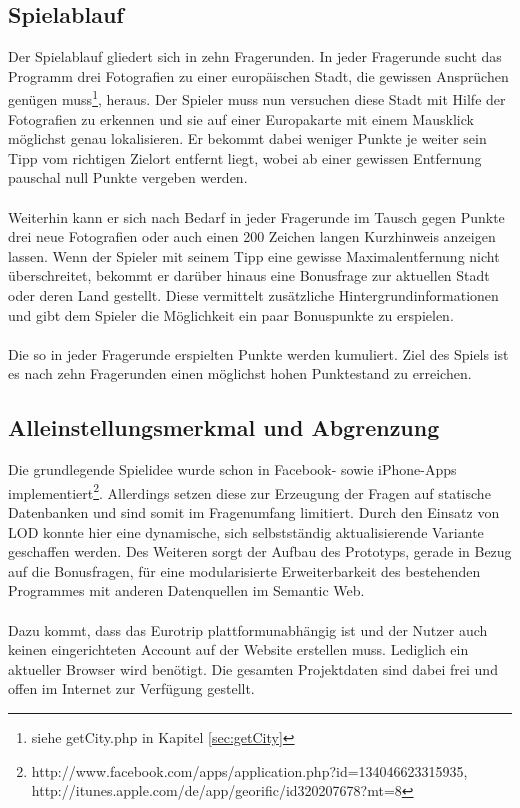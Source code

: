 \documentclass[a4paper, 11pt]{article}
\begin{document}
\subsection{Spielablauf}
Der Spielablauf gliedert sich in zehn Fragerunden. In jeder Fragerunde sucht das Programm drei Fotografien zu einer europäischen Stadt, die gewissen Ansprüchen genügen muss\footnote{siehe getCity.php in Kapitel \ref{sec:getCity}}, heraus. Der Spieler muss nun versuchen diese Stadt mit Hilfe der Fotografien zu erkennen und sie auf einer Europakarte mit einem Mausklick möglichst genau lokalisieren. Er bekommt dabei weniger Punkte je weiter sein Tipp vom richtigen Zielort entfernt liegt, wobei ab einer gewissen Entfernung pauschal null Punkte vergeben werden.\\\\ Weiterhin kann er sich nach Bedarf in jeder Fragerunde im Tausch gegen Punkte drei neue Fotografien oder auch einen 200 Zeichen langen Kurzhinweis anzeigen lassen. Wenn der Spieler mit seinem Tipp eine gewisse Maximalentfernung nicht überschreitet, bekommt er darüber hinaus eine Bonusfrage zur aktuellen Stadt oder deren Land gestellt. Diese vermittelt zusätzliche Hintergrundinformationen und gibt dem Spieler die Möglichkeit ein paar Bonuspunkte zu erspielen.\\\\ 
Die so in jeder Fragerunde erspielten Punkte werden kumuliert. Ziel des Spiels ist es nach zehn Fragerunden einen möglichst hohen Punktestand zu erreichen.
\subsection{Alleinstellungsmerkmal und Abgrenzung}
Die grundlegende Spielidee wurde schon in Facebook- sowie iPhone-Apps implementiert\footnote{http://www.facebook.com/apps/application.php?id=134046623315935, \\http://itunes.apple.com/de/app/georific/id320207678?mt=8}. Allerdings setzen diese zur Erzeugung der Fragen auf statische Datenbanken und sind somit im Fragenumfang limitiert. Durch den Einsatz von LOD konnte hier eine dynamische, sich selbstständig aktualisierende Variante geschaffen werden. Des Weiteren sorgt der Aufbau des Prototyps, gerade in Bezug auf die Bonusfragen, für eine modularisierte Erweiterbarkeit des bestehenden Programmes mit anderen Datenquellen im Semantic Web.\\\\
Dazu kommt, dass das Eurotrip plattformunabhängig ist und der Nutzer auch keinen eingerichteten Account auf der Website erstellen muss. Lediglich ein aktueller Browser wird benötigt. Die gesamten Projektdaten sind dabei frei und offen im Internet zur Verfügung gestellt.
\end{document}
